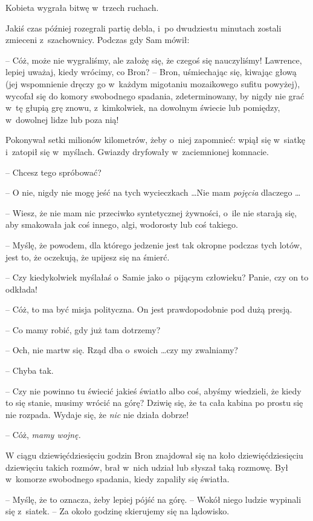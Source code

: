 \documentclass[oneside,polish,11pt,rmheadings]{mwbk}
\begin{document}
Kobieta wygrała bitwę w~trzech ruchach. 

Jakiś czas później rozegrali partię debla, i~po dwudziestu minutach zostali zmieceni z~szachownicy. Podczas gdy Sam mówił: 

-- Cóż, może nie wygraliśmy, ale założę się, że czegoś się nauczyliśmy! Lawrence, lepiej uważaj, kiedy wrócimy, co Bron? -- Bron, uśmiechając się, kiwając głową (jej wspomnienie dręczy go w~każdym migotaniu mozaikowego sufitu powyżej), wycofał się do komory swobodnego spadania, zdeterminowany, by nigdy nie grać w~tę głupią grę znowu, z~kimkolwiek, na dowolnym świecie lub pomiędzy, w~dowolnej lidze lub poza nią! 

Pokonywał setki milionów kilometrów, żeby o~niej zapomnieć: wpiął się w~siatkę i~zatopił się w~myślach. Gwiazdy dryfowały w~zaciemnionej komnacie. 

-- Chcesz tego spróbować? 

-- O nie, nigdy nie mogę jeść na tych wycieczkach \ldots   Nie mam \textit{pojęcia }dlaczego \ldots  

-- Wiesz, że nie mam nic przeciwko syntetycznej żywności, o~ile nie starają się, aby smakowała jak coś innego, algi, wodorosty lub coś takiego. 

-- Myślę, że powodem, dla którego jedzenie jest tak okropne podczas tych lotów, jest to, że oczekują, że upijesz się na śmierć. 

-- Czy kiedykolwiek myślałaś o~Samie jako o~pijącym człowieku? Panie, czy on to odkłada! 

-- Cóż, to ma być misja polityczna. On jest prawdopodobnie pod dużą presją. 

-- Co mamy robić, gdy już tam dotrzemy? 

-- Och, nie martw się. Rząd dba o~swoich \ldots  czy my zwalniamy?

-- Chyba tak. 

-- Czy nie powinno tu świecić jakieś światło albo coś, abyśmy wiedzieli, że kiedy to się stanie, musimy wrócić na górę? Dziwię się, że ta cała kabina po prostu się nie rozpada. Wydaje się, że \textit{nic }nie działa dobrze! 

-- Cóż, \textit{mamy wojnę.} 

W ciągu dziewięćdziesięciu godzin Bron znajdował się na koło dziewięćdziesięciu dziewięciu takich rozmów, brał w~nich udział lub słyszał taką rozmowę. Był w~komorze swobodnego spadania, kiedy zapaliły się światła. 

-- Myślę, że to oznacza, żeby lepiej pójść na górę. -- Wokół niego ludzie wypinali się z~siatek. -- Za około godzinę skierujemy się na lądowisko. 
\end{document}
